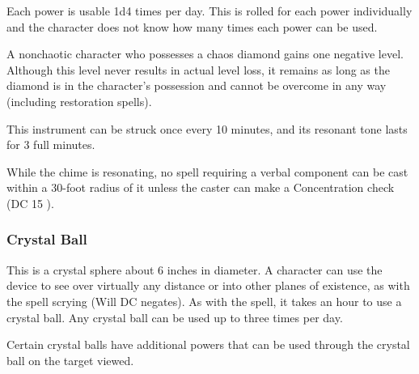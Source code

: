 {Each power is usable 1d4 times per day. This is rolled for each power individually and the character does not know how many times each power can be used.

A nonchaotic character who possesses a chaos diamond gains one negative level. Although this level never results in actual level loss, it remains as long as the diamond is in the character's possession and cannot be overcome in any way (including restoration spells).


 This instrument can be struck once every 10 minutes, and its resonant tone lasts for 3 full minutes.

While the chime is resonating, no spell requiring a verbal component can be cast within a 30-foot radius of it unless the caster can make a Concentration check (DC 15 \add {}).


\subsubsection{Crystal Ball} This is a crystal sphere about 6 inches in diameter. A character can use the device to see over virtually any distance or into other planes of existence, as with the spell scrying (Will DC  negates). As with the  spell, it takes an hour to use a crystal ball. Any crystal ball can be used up to three times per day.

Certain crystal balls have additional powers that can be used through the crystal ball on the target viewed.

}

